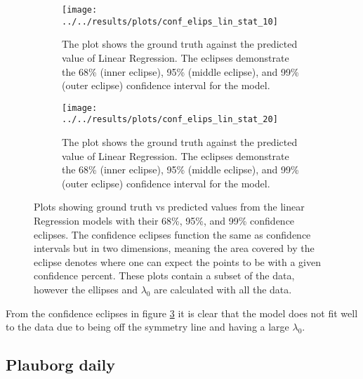 \begin{figure}
		\begin{subfigure}{0.45\linewidth}
			\centering
			\texttt{[image: ../../results/plots/conf\_elips\_lin\_stat\_10]}
			\caption[Confidence eclipse of Linear Regression 10cm]{The plot shows the ground truth against the predicted value of Linear Regression. The eclipses demonstrate the 68\% (inner eclipse), 95\% (middle eclipse), and 99\% (outer eclipse) confidence interval for the model.}
			\label{fig:confelipslinstat10}
		\end{subfigure}
	\hfill
		\begin{subfigure}{0.45\textwidth}
			\centering
			\texttt{[image: ../../results/plots/conf\_elips\_lin\_stat\_20]}
			\caption[Confidence eclipse of Linear Regression 20cm]{The plot shows the ground truth against the predicted value of Linear Regression. The eclipses demonstrate the 68\% (inner eclipse), 95\% (middle eclipse), and 99\% (outer eclipse) confidence interval for the model.}
			\label{fig:confelipslinstat20}
		\end{subfigure}
	\caption{Plots showing ground truth vs predicted values from the linear Regression models with their 68\%, 95\%, and 99\% confidence eclipses. The confidence eclipses function the same as confidence intervals but in two dimensions, meaning the area covered by the eclipse denotes where one can expect the points to be with a given confidence percent. These plots contain a subset of the data, however the ellipses and $\lambda_0$ are calculated with all the data.}
	\label{fig:lin:eclipse}
\end{figure}

From the confidence eclipses in figure \ref{fig:lin:eclipse} it is clear that the model does not fit well to the data due to being off the symmetry line and having a large $\lambda_0$.

\subsection{Plauborg daily}

